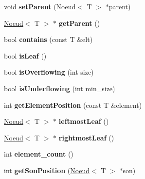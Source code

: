 \begin{DoxyCompactItemize}
\item 
\hypertarget{classNoeud_a7f0b92d936783852dd8f6005c0af46c1}{
void {\bfseries setParent} (\hyperlink{classNoeud}{Noeud}$<$ T $>$ $\ast$parent)}
\label{classNoeud_a7f0b92d936783852dd8f6005c0af46c1}

\item 
\hypertarget{classNoeud_a45b167fcea2f17f982c78700dfefe200}{
\hyperlink{classNoeud}{Noeud}$<$ T $>$ $\ast$ {\bfseries getParent} ()}
\label{classNoeud_a45b167fcea2f17f982c78700dfefe200}

\item 
\hypertarget{classNoeud_ad0d9bb9321ec052b84bc2b0ad0d3cd2f}{
bool {\bfseries contains} (const T \&elt)}
\label{classNoeud_ad0d9bb9321ec052b84bc2b0ad0d3cd2f}

\item 
\hypertarget{classNoeud_a2027d0f848391fb0b7aa0e599568aa95}{
bool {\bfseries isLeaf} ()}
\label{classNoeud_a2027d0f848391fb0b7aa0e599568aa95}

\item 
\hypertarget{classNoeud_abe2105490466f57d202308123fae8726}{
bool {\bfseries isOverflowing} (int size)}
\label{classNoeud_abe2105490466f57d202308123fae8726}

\item 
\hypertarget{classNoeud_aec41238cb00861543f2d819a706d82b0}{
bool {\bfseries isUnderflowing} (int min\_\-size)}
\label{classNoeud_aec41238cb00861543f2d819a706d82b0}

\item 
\hypertarget{classNoeud_a458ef7ea7113a03e3cdf562ca75a3a0f}{
int {\bfseries getElementPosition} (const T \&element)}
\label{classNoeud_a458ef7ea7113a03e3cdf562ca75a3a0f}

\item 
\hypertarget{classNoeud_a34ec8dfd905946d3a55e7ddc0a3fd07d}{
\hyperlink{classNoeud}{Noeud}$<$ T $>$ $\ast$ {\bfseries leftmostLeaf} ()}
\label{classNoeud_a34ec8dfd905946d3a55e7ddc0a3fd07d}

\item 
\hypertarget{classNoeud_acb5eef9cce35d271078628be447e7bd7}{
\hyperlink{classNoeud}{Noeud}$<$ T $>$ $\ast$ {\bfseries rightmostLeaf} ()}
\label{classNoeud_acb5eef9cce35d271078628be447e7bd7}

\item 
\hypertarget{classNoeud_a976a7fcb72e63237c9f3c8f85ddb820d}{
int {\bfseries element\_\-count} ()}
\label{classNoeud_a976a7fcb72e63237c9f3c8f85ddb820d}

\item 
\hypertarget{classNoeud_a8f9a238c0455368945aeaa531bed9228}{
int {\bfseries getSonPosition} (\hyperlink{classNoeud}{Noeud}$<$ T $>$ $\ast$son)}
\label{classNoeud_a8f9a238c0455368945aeaa531bed9228}


\end{DoxyCompactItemize}
